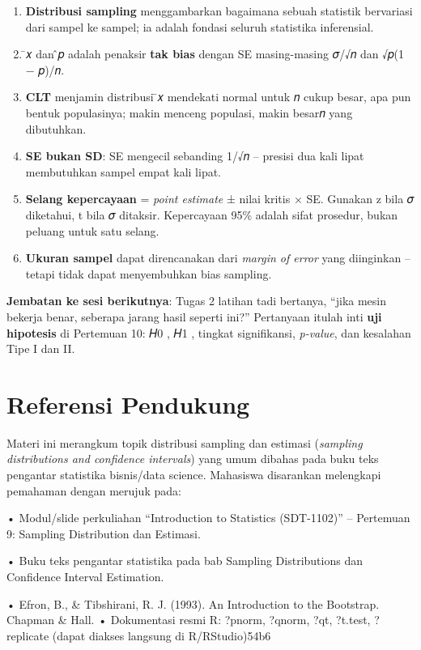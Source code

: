 \documentclass[
  indonesian,
  letterpaper,
]{book}
\providecommand{\tightlist}{%
  \setlength{\itemsep}{0pt}\setlength{\parskip}{0pt}}
\begin{document}
\begin{enumerate}
\def\labelenumi{\arabic{enumi}.}
\tightlist
\item
  \textbf{Distribusi sampling} menggambarkan bagaimana sebuah statistik
  bervariasi dari sampel ke sampel; ia adalah fondasi seluruh statistika
  inferensial.
\item
  ̄𝑥 dan ̂𝑝 adalah penaksir \textbf{tak bias} dengan SE masing-masing
  𝜎/√𝑛 dan √𝑝(1 − 𝑝)/𝑛.
\item
  \textbf{CLT} menjamin distribusi ̄𝑥 mendekati normal untuk 𝑛 cukup
  besar, apa pun bentuk populasinya; makin menceng populasi, makin
  besar𝑛 yang dibutuhkan.
\item
  \textbf{SE bukan SD}: SE mengecil sebanding 1/√𝑛 -- presisi dua kali
  lipat membutuhkan sampel empat kali lipat.
\item
  \textbf{Selang kepercayaan} = \emph{point estimate} ± nilai kritis ×
  SE. Gunakan z bila 𝜎 diketahui, t bila 𝜎 ditaksir. Kepercayaan 95\%
  adalah sifat prosedur, bukan peluang untuk satu selang.
\item
  \textbf{Ukuran sampel} dapat direncanakan dari \emph{margin of error}
  yang diinginkan -- tetapi tidak dapat menyembuhkan bias sampling.
\end{enumerate}

\textbf{Jembatan ke sesi berikutnya}: Tugas 2 latihan tadi bertanya,
``jika mesin bekerja benar, seberapa jarang hasil seperti ini?''
Pertanyaan itulah inti \textbf{uji hipotesis} di Pertemuan 10: 𝐻0 , 𝐻1 ,
tingkat signifikansi, \emph{p-value}, dan kesalahan Tipe I dan II.


\chapter{Referensi Pendukung}\label{referensi-pendukung}

Materi ini merangkum topik distribusi sampling dan estimasi
(\emph{sampling distributions and confidence intervals}) yang umum
dibahas pada buku teks pengantar statistika bisnis/data science.
Mahasiswa disarankan melengkapi pemahaman dengan merujuk pada:

• Modul/slide perkuliahan ``Introduction to Statistics (SDT-1102)'' --
Pertemuan 9: Sampling Distribution dan Estimasi.

• Buku teks pengantar statistika pada bab Sampling Distributions dan
Confidence Interval Estimation.

• Efron, B., \& Tibshirani, R. J. (1993). An Introduction to the
Bootstrap. Chapman \& Hall. • Dokumentasi resmi R: ?pnorm, ?qnorm, ?qt,
?t.test, ?replicate (dapat diakses langsung di R/RStudio)54b6
\end{document}
